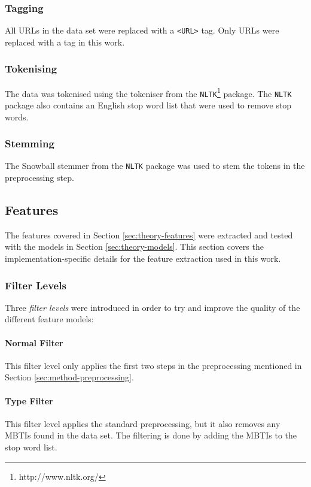 \subsubsection{Tagging}
All URLs in the data set were replaced with a \texttt{<URL>} tag.
Only URLs were replaced with a tag in this work.

\subsubsection{Tokenising}
The data was tokenised using the tokeniser from the \texttt{NLTK}\footnote{http://www.nltk.org/} package.
The \texttt{NLTK} package also contains an English stop word list that were used to remove stop words.

\subsubsection{Stemming}
The Snowball stemmer from the \texttt{NLTK} package was used to stem the tokens in the preprocessing step. 

\subsection{Features}

The features covered in Section \ref{sec:theory-features} were extracted and tested with the models in Section \ref{sec:theory-models}.
This section covers the implementation-specific details for the feature extraction used in this work.

\subsubsection{Filter Levels} \label{sec:method-filter-levels}
Three \emph{filter levels} were introduced in order to try and improve the quality of the different feature models:

\paragraph{Normal Filter} \label{sec:method-normal-filter}
This filter level only applies the first two steps in the preprocessing mentioned in Section \ref{sec:method-preprocessing}.

\paragraph{Type Filter} \label{sec:method-type-filter}
This filter level applies the standard preprocessing, but it also removes any MBTIs found in the data set.
The filtering is done by adding the MBTIs to the stop word list.


